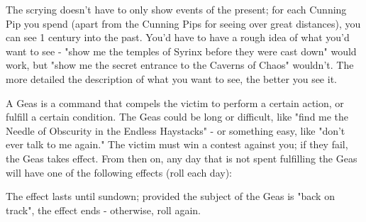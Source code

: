 The scrying doesn't have to only show events of the present; for each Cunning Pip you spend (apart from the Cunning Pips for seeing over great distances), you can see 1 century into the past. You'd have to have a rough idea of what you'd want to see - "show me the temples of Syrinx before they were cast down" would work, but "show me the secret entrance to the Caverns of Chaos" wouldn't.  The more detailed the description of what you want to see, the better you see it.



\cbreak


\OCCULT[
  Name=Geas,
  Link=occultism-geas,
  Pips=10,
  Time=Days
]

A Geas is a command that compels the victim to perform a certain action, or fulfill a certain condition. The Geas could be long or difficult, like "find me the Needle of Obscurity in the Endless Haystacks" - or something easy, like "don't ever talk to me again." The victim must win a \RBTRY{\FOC}{\FOC} contest against you; if they fail, the Geas takes effect. From then on, any day that is not spent fulfilling the Geas will have one of the following effects (roll each day):



The effect lasts until sundown; provided the subject of the Geas is "back on track", the effect ends - otherwise, roll again.

